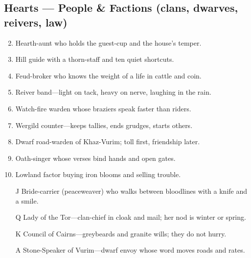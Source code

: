 \subsection*{Hearts --- People \& Factions (clans, dwarves, reivers, law)}
\label{sec:ubral-people}
\begin{enumerate}
\setcounter{enumi}{1}
\item Hearth-aunt who holds the guest-cup and the house's temper.
\item Hill guide with a thorn-staff and ten quiet shortcuts.
\item Feud-broker who knows the weight of a life in cattle and coin.
\item Reiver band---light on tack, heavy on nerve, laughing in the rain.
\item Watch-fire warden whose braziers speak faster than riders.
\item Wergild counter---keeps tallies, ends grudges, starts others.
\item Dwarf road-warden of Khaz-Vurim; toll first, friendship later.
\item Oath-singer whose verses bind hands and open gates.
\item Lowland factor buying iron blooms and selling trouble.
\item[J] Bride-carrier (peaceweaver) who walks between bloodlines with a knife and a smile.
\item[Q] Lady of the Tor---clan-chief in cloak and mail; her nod is winter or spring.
\item[K] Council of Cairns---greybeards and granite wills; they do not hurry.
\item[A] Stone-Speaker of Vurim---dwarf envoy whose word moves roads and rates.
\end{enumerate}

